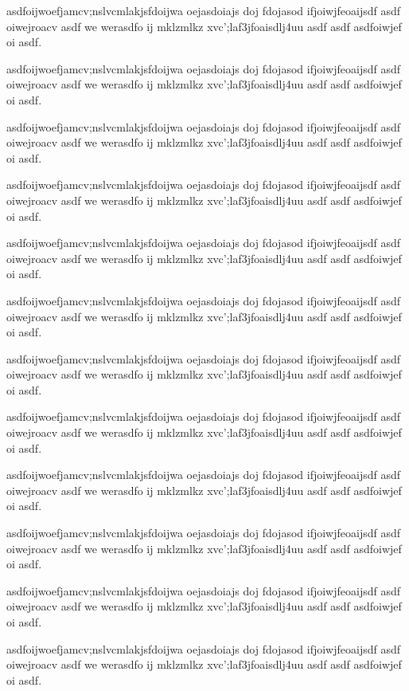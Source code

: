 \documentclass[a4paper,10pt]{article}
\begin{document}
asdfoijwoefjamcv;nslvcmlakjsfdoijwa oejasdoiajs doj fdojasod ifjoiwjfeoaijsdf asdf 
oiwejroacv asdf we werasdfo ij mklzmlkz xvc';laf3jfoaisdlj4uu asdf asdf 
asdfoiwjef oi asdf.

asdfoijwoefjamcv;nslvcmlakjsfdoijwa oejasdoiajs doj fdojasod ifjoiwjfeoaijsdf asdf 
oiwejroacv asdf we werasdfo ij mklzmlkz xvc';laf3jfoaisdlj4uu asdf asdf 
asdfoiwjef oi asdf.

asdfoijwoefjamcv;nslvcmlakjsfdoijwa oejasdoiajs doj fdojasod ifjoiwjfeoaijsdf asdf 
oiwejroacv asdf we werasdfo ij mklzmlkz xvc';laf3jfoaisdlj4uu asdf asdf 
asdfoiwjef oi asdf.

asdfoijwoefjamcv;nslvcmlakjsfdoijwa oejasdoiajs doj fdojasod ifjoiwjfeoaijsdf asdf 
oiwejroacv asdf we werasdfo ij mklzmlkz xvc';laf3jfoaisdlj4uu asdf asdf 
asdfoiwjef oi asdf.

asdfoijwoefjamcv;nslvcmlakjsfdoijwa oejasdoiajs doj fdojasod ifjoiwjfeoaijsdf asdf 
oiwejroacv asdf we werasdfo ij mklzmlkz xvc';laf3jfoaisdlj4uu asdf asdf 
asdfoiwjef oi asdf.

asdfoijwoefjamcv;nslvcmlakjsfdoijwa oejasdoiajs doj fdojasod ifjoiwjfeoaijsdf asdf 
oiwejroacv asdf we werasdfo ij mklzmlkz xvc';laf3jfoaisdlj4uu asdf asdf 
asdfoiwjef oi asdf.

asdfoijwoefjamcv;nslvcmlakjsfdoijwa oejasdoiajs doj fdojasod ifjoiwjfeoaijsdf asdf 
oiwejroacv asdf we werasdfo ij mklzmlkz xvc';laf3jfoaisdlj4uu asdf asdf 
asdfoiwjef oi asdf.

asdfoijwoefjamcv;nslvcmlakjsfdoijwa oejasdoiajs doj fdojasod ifjoiwjfeoaijsdf asdf 
oiwejroacv asdf we werasdfo ij mklzmlkz xvc';laf3jfoaisdlj4uu asdf asdf 
asdfoiwjef oi asdf.

asdfoijwoefjamcv;nslvcmlakjsfdoijwa oejasdoiajs doj fdojasod ifjoiwjfeoaijsdf asdf 
oiwejroacv asdf we werasdfo ij mklzmlkz xvc';laf3jfoaisdlj4uu asdf asdf 
asdfoiwjef oi asdf.

asdfoijwoefjamcv;nslvcmlakjsfdoijwa oejasdoiajs doj fdojasod ifjoiwjfeoaijsdf asdf 
oiwejroacv asdf we werasdfo ij mklzmlkz xvc';laf3jfoaisdlj4uu asdf asdf 
asdfoiwjef oi asdf.

asdfoijwoefjamcv;nslvcmlakjsfdoijwa oejasdoiajs doj fdojasod ifjoiwjfeoaijsdf asdf 
oiwejroacv asdf we werasdfo ij mklzmlkz xvc';laf3jfoaisdlj4uu asdf asdf 
asdfoiwjef oi asdf.

asdfoijwoefjamcv;nslvcmlakjsfdoijwa oejasdoiajs doj fdojasod ifjoiwjfeoaijsdf asdf 
oiwejroacv asdf we werasdfo ij mklzmlkz xvc';laf3jfoaisdlj4uu asdf asdf 
asdfoiwjef oi asdf.
\end{document}
